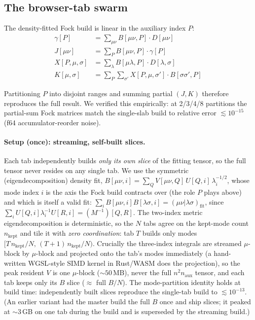 \documentclass[11pt]{article}
\begin{document}
\subsection{The browser-tab swarm}
\label{sec:swarm}

The density-fitted Fock build is linear in the auxiliary index $P$:
\begin{align*}
  \gamma[P]      &= \textstyle\sum_{\mu\nu} B[\mu\nu,P]\cdot D[\mu\nu] \\
  J[\mu\nu]      &= \textstyle\sum_{P} B[\mu\nu,P]\cdot \gamma[P] \\
  X[P,\mu,\sigma]&= \textstyle\sum_{\lambda} B[\mu\lambda,P]\cdot D[\lambda,\sigma] \\
  K[\mu,\sigma]  &= \textstyle\sum_{P}\sum_{\sigma'} X[P,\mu,\sigma']\cdot B[\sigma\sigma',P]
\end{align*}

Partitioning $P$ into disjoint ranges and summing partial $(J,K)$ therefore
reproduces the full result. We verified this empirically: at 2/3/4/8 partitions
the partial-sum Fock matrices match the single-slab build to relative error
$\lesssim 10^{-15}$ (f64 accumulator-reorder noise).

\paragraph{Setup (once): streaming, self-built slices.} Each tab independently
builds \emph{only its own slice} of the fitting tensor, so the full tensor never
resides on any single tab. We use the symmetric (eigendecomposition) density
fit, $B[\mu\nu,i] = \sum_Q V[\mu\nu,Q]\,U[Q,i]\,\lambda_i^{-1/2}$, whose mode
index $i$ is the axis the Fock build contracts over (the role $P$ plays above)
and which is itself a valid fit: $\sum_i B[\mu\nu,i]B[\lambda\sigma,i] =
(\mu\nu|\lambda\sigma)_{\mathrm{fit}}$, since $\sum_i U[Q,i]\lambda_i^{-1}U[R,i]
= (M^{-1})[Q,R]$. The two-index metric eigendecomposition is deterministic, so
the $N$ tabs agree on the kept-mode count $n_{\mathrm{kept}}$ and tile it with
\emph{zero coordination}: tab $T$ builds only modes
$[T\,n_{\mathrm{kept}}/N,\,(T{+}1)\,n_{\mathrm{kept}}/N)$. Crucially the
three-index integrals are streamed $\mu$-block by $\mu$-block and projected onto
the tab's modes immediately (a hand-written WGSL-style SIMD kernel in Rust/WASM
does the projection), so the peak resident $V$ is one $\mu$-block
($\sim\!50$\,MB), never the full $n^2 n_{\mathrm{aux}}$ tensor, and each tab
keeps only its $B$ slice ($\approx$ full $B/N$). The mode-partition identity
holds at build time: independently built slices reproduce the single-tab build
to $\lesssim 10^{-13}$. (An earlier variant had the master build the full $B$
once and ship slices; it peaked at $\sim$3\,GB on one tab during the build and
is superseded by the streaming build.)
\end{document}
